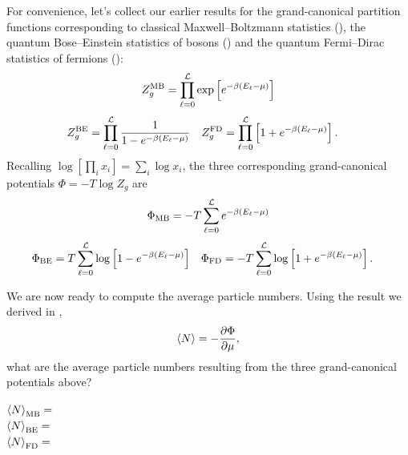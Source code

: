 For convenience, let's collect our earlier results for the grand-canonical partition functions corresponding to classical Maxwell--Boltzmann statistics (), the quantum Bose--Einstein statistics of bosons () and the quantum Fermi--Dirac statistics of fermions ():
\begin{equation*}
  Z_g^{\text{MB}} = \prod_{\ell = 0}^{\mathcal L} \exp\left[e^{-\beta\left(E_{\ell} - \mu\right)}\right]
\end{equation*}
\begin{align*}
  Z_g^{\text{BE}} & = \prod_{\ell = 0}^{\mathcal L} \frac{1}{1 - e^{-\beta (E_{\ell} - \mu)}} &
  Z_g^{\text{FD}} & = \prod_{\ell = 0}^{\mathcal L} \left[1 + e^{-\beta (E_{\ell} - \mu)}\right].
\end{align*}
Recalling $\log\left[\prod_i x_i\right] = \sum_i \log x_i$, the three corresponding grand-canonical potentials $\Phi = -T \log Z_g$ are
\begin{equation*}
  \Phi_{\text{MB}} = -T \sum_{\ell = 0}^{\mathcal L} e^{-\beta\left(E_{\ell} - \mu\right)}
\end{equation*}
\begin{align*}
  \Phi_{\text{BE}} & =  T \sum_{\ell = 0}^{\mathcal L} \log\left[1 - e^{-\beta (E_{\ell} - \mu)}\right] &
  \Phi_{\text{FD}} & = -T \sum_{\ell = 0}^{\mathcal L} \log\left[1 + e^{-\beta (E_{\ell} - \mu)}\right].
\end{align*}

We are now ready to compute the average particle numbers.
Using the result we derived in ,
\begin{equation*}
  \left\langle N \right\rangle = -\frac{\partial \Phi}{\partial \mu},
\end{equation*}
what are the average particle numbers resulting from the three grand-canonical potentials above?
\begin{mdframed}
  $\displaystyle \left\langle N \right\rangle_{\text{MB}} = $ \\[52 pt]
  $\displaystyle \left\langle N \right\rangle_{\text{BE}} = $ \\[52 pt]
  $\displaystyle \left\langle N \right\rangle_{\text{FD}} = $ \\[52 pt]
\end{mdframed}

